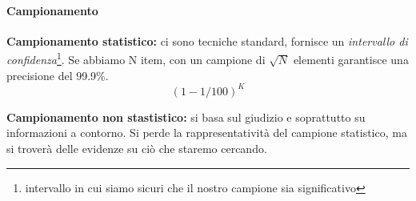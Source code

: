 \paragraph{Campionamento}

\textbf{Campionamento statistico:} ci sono tecniche standard, fornisce un 
\textit{intervallo di confidenza}\footnote{intervallo in cui siamo sicuri che il nostro 
campione sia significativo}. Se abbiamo N item, con un campione di $\sqrt{N}$ 
elementi garantisce una precisione del 99.9\%.
$$
(1 - 1/100)^K
$$

\textbf{Campionamento non stastistico:} si basa sul giudizio e soprattutto su 
informazioni a contorno. Si perde la rappresentatività del campione statistico, 
ma si troverà delle evidenze su ciò che staremo cercando.

